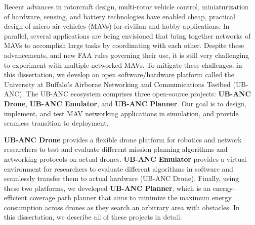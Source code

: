 
Recent advances in rotorcraft design, multi-rotor vehicle control, miniaturization of hardware, sensing, and battery technologies have enabled cheap, practical design of micro air vehicles (MAVs) for civilian and hobby applications. In parallel, several applications are being envisioned that bring together networks of MAVs to accomplish large tasks by coordinating with each other. Despite these advancements, and new FAA rules governing their use, it is still very challenging to experiment with multiple networked MAVs. To mitigate these challenges, in this dissertation, we develop an open software/hardware platform called the University at Buffalo's Airborne Networking and Communications Testbed (UB-ANC). The UB-ANC ecosystem comprises three open-source projects: \textbf{UB-ANC Drone}, \textbf{UB-ANC Emulator}, and \textbf{UB-ANC Planner}. Our goal is to design, implement, and test MAV networking applications in simulation, and provide seamless transition to deployment.

\textbf{UB-ANC Drone} provides a flexible drone platform for robotics and network researchers to test and evaluate different mission planning algorithms and networking protocols on actual drones. \textbf{UB-ANC Emulator} provides a virtual environment for researchers to evaluate different algorithms in software and seamlessly transfer them to actual hardware (UB-ANC Drone). Finally, using these two platforms, we developed \textbf{UB-ANC Planner}, which is an energy-efficient coverage path planner that aims to minimize the maximum energy consumption across drones as they search an arbitrary area with obstacles. In this dissertation, we describe all of these projects in detail.